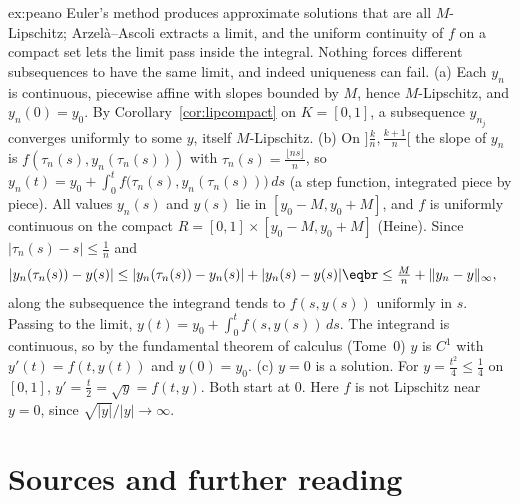 \begin{solution}{ex:peano}
\idea Euler's method produces approximate solutions that are all $M$-Lipschitz; Arzel\`a--Ascoli extracts a limit, and the uniform continuity
of $f$ on a compact set lets the limit pass inside the integral. Nothing forces different subsequences to have the same limit, and indeed
uniqueness can fail.
\writeup (a) Each $y_n$ is continuous, piecewise affine with slopes bounded by $M$, hence $M$-Lipschitz, and $y_n(0)=y_0$. By Corollary~\ref{cor:lipcompact} on $K=[0,1]$, a
subsequence $y_{n_j}$ converges uniformly to some $y$, itself $M$-Lipschitz.
(b) On $]\frac kn,\frac{k+1}n[$ the slope of $y_n$ is $f(\tau_n(s),y_n(\tau_n(s)))$ with $\tau_n(s)=\frac{\lfloor ns\rfloor}n$, so $y_n(t)=y_0+\int_0^tf\bigl(\tau_n(s),y_n(\tau_n(s))\bigr)\,ds$ (a step function,
integrated piece by piece). All values $y_n(s)$ and $y(s)$ lie in $[y_0-M,y_0+M]$, and $f$ is uniformly continuous on the compact $R=[0,1]\times[y_0-M,y_0+M]$ (Heine).
Since $|\tau_n(s)-s|\le\frac1n$ and
\[\begin{aligned}|y_n(\tau_n(s))-y(s)|&\le|y_n(\tau_n(s))-y_n(s)|+|y_n(s)-y(s)|\eqbr\le\tfrac Mn+\|y_n-y\|_\infty,\end{aligned}\]
along the subsequence the integrand tends to $f(s,y(s))$ uniformly in $s$. Passing to the limit, $y(t)=y_0+\int_0^tf(s,y(s))\,ds$. The integrand is continuous, so by the
fundamental theorem of calculus (Tome~0) $y$ is $C^1$ with $y'(t)=f(t,y(t))$ and $y(0)=y_0$.
(c) $y=0$ is a solution. For $y=\frac{t^2}4\le\frac14$ on $[0,1]$, $y'=\frac t2=\sqrt{y}=f(t,y)$. Both start at $0$. Here $f$ is not Lipschitz near $y=0$, since $\sqrt{|y|}/|y|\to\infty$.
\end{solution}

\section*{Sources and further reading}

